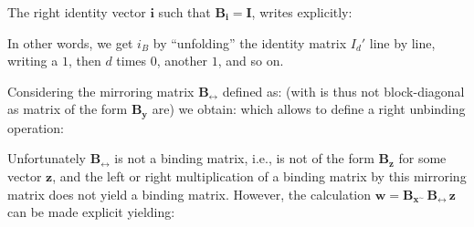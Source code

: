 
The right identity vector $\mathbf{\mathbf{i}}$ such that $\mathbf{B_{\mathbf{i}}} = \mathbf{I}$, writes explicitly:
\iftrue
{}
In other words, we get $i_B$ by ``unfolding'' the identity matrix $I_d'$ line by line, writing a $1$, then $d$ times $0$, another $1$, and so on.
\else
\eqline{\mathbf{\mathbf{i}} \deq \frac{1}{\sqrt{d'}} \, \left(1, \underbrace{0, \cdots 0}_{d' \mbox{\scriptsize times}}, 1, \underbrace{0, \cdots 0}_{d' \mbox{\scriptsize times}}, 1, \cdots, 1\right)^T.}
In other words, we get $i_B$ by ``unfolding'' the identity matrix $I_d'$ line by line, i.e., the $i$-th coordinate is zero unless $i = (k - 1) \, d' + k$ for some $k, 0 < k \leq d'$, which also corresponds to $i = \sigma(i)$.
\fi

Considering the mirroring matrix $\mathbf{B_{\leftrightarrow}}$ defined as:
(with is thus not block-diagonal as matrix of the form $\mathbf{B_y}$ are) we obtain:
which allows to define a right unbinding operation:


Unfortunately $\mathbf{B_{\leftrightarrow}}$ is not a binding matrix, i.e., is not of the form $\mathbf{B_z}$ for some vector $\mathbf{z}$, and the left or right multiplication of a binding matrix by this mirroring matrix does not yield a binding matrix. However, the calculation $\mathbf{w} = \mathbf{B_{x^\sim}} \, \mathbf{B_{\leftrightarrow}} \, \mathbf{z}$ can be made explicit yielding:


